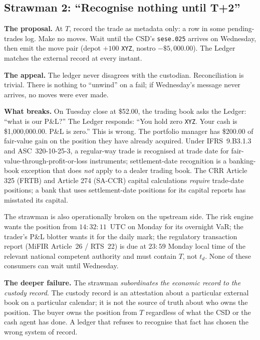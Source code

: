 \documentclass[11pt,a4paper]{article}
\begin{document}
\subsection{Strawman 2: ``Recognise nothing until T+2''}
\label{sec:strawman-2}

\textbf{The proposal.} At $T$, record the trade as metadata only: a row in some pending-trades log. Make no moves. Wait until the CSD's \texttt{sese.025} arrives on Wednesday, then emit the move pair (depot $+100$ \texttt{XYZ}, nostro $-\$5{,}000.00$). The Ledger matches the external record at every instant.

\textbf{The appeal.} The ledger never disagrees with the custodian. Reconciliation is trivial. There is nothing to ``unwind'' on a fail; if Wednesday's message never arrives, no moves were ever made.

\textbf{What breaks.} On Tuesday close at \$52.00, the trading book asks the Ledger: ``what is our P\&L?'' The Ledger responds: ``You hold zero \texttt{XYZ}. Your cash is \$1{,}000{,}000.00. P\&L is zero.'' This is wrong. The portfolio manager has \$200.00 of fair-value gain on the position they have already acquired. Under IFRS~9.B3.1.3 and ASC~320-10-25-3, a regular-way trade is recognised at trade date for fair-value-through-profit-or-loss instruments; settlement-date recognition is a banking-book exception that does \emph{not} apply to a dealer trading book. The CRR Article 325 (FRTB) and Article 274 (SA-CCR) capital calculations \emph{require} trade-date positions; a bank that uses settlement-date positions for its capital reports has misstated its capital.

The strawman is also operationally broken on the upstream side. The risk engine wants the position from $14{:}32{:}11$~UTC on Monday for its overnight VaR; the trader's P\&L blotter wants it for the daily mark; the regulatory transaction report (MiFIR Article~26 / RTS~22) is due at $23{:}59$ Monday local time of the relevant national competent authority and must contain $T$, not $t_d$. None of these consumers can wait until Wednesday.

\textbf{The deeper failure.} The strawman \emph{subordinates the economic record to the custody record}. The custody record is an attestation about a particular external book on a particular calendar; it is not the source of truth about who owns the position. The buyer owns the position from $T$ regardless of what the CSD or the cash agent has done. A ledger that refuses to recognise that fact has chosen the wrong system of record.
\end{document}
